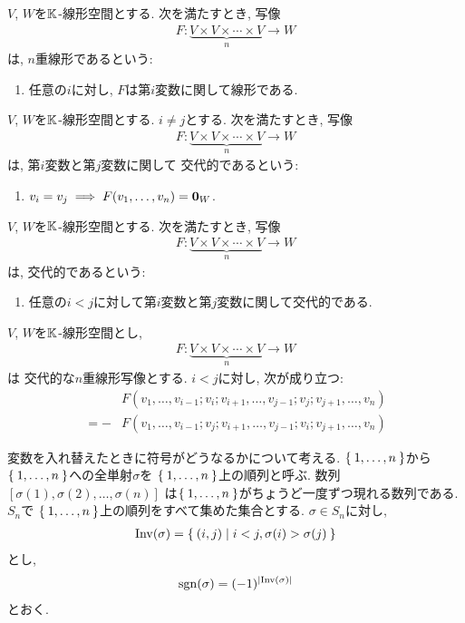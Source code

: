 \begin{definition}
  $V$, $W$を$\mathbb{K}$-線形空間とする.
  次を満たすとき,
  写像
  \begin{align*}
    F\colon \underbrace{V\times V\times \cdots \times V}_n\to W
  \end{align*}
  は,
  $n$重線形であるという:
  \begin{enumerate}
  \item 任意の$i$に対し, $F$は第$i$変数に関して線形である.
  \end{enumerate}
\end{definition}

\begin{definition}
  $V$, $W$を$\mathbb{K}$-線形空間とする.
  $i\neq j$とする.
  次を満たすとき,
  写像
  \begin{align*}
    F\colon \underbrace{V\times V\times \cdots \times V}_n\to W
  \end{align*}
  は,
  第$i$変数と第$j$変数に関して
  交代的であるという:
  \begin{enumerate}
      \item $v_i=v_j\implies F(v_1,\ldots,v_n)=\boldsymbol{0}_W$.
  \end{enumerate}
\end{definition}

\begin{definition}
  $V$, $W$を$\mathbb{K}$-線形空間とする.
  次を満たすとき,
  写像
  \begin{align*}
    F\colon \underbrace{V\times V\times \cdots \times V}_n\to W
  \end{align*}
  は,
  交代的であるという:
  \begin{enumerate}
  \item
    任意の$i<j$に対して第$i$変数と第$j$変数に関して交代的である.
  \end{enumerate}
\end{definition}
\begin{prop}
  $V$, $W$を$\mathbb{K}$-線形空間とし,
  \begin{align*}
    F\colon \underbrace{V\times V\times \cdots \times V}_n\to W
  \end{align*}
  は
  交代的な$n$重線形写像とする.
  $i<j$に対し, 次が成り立つ:
  \begin{align*}
    &F(v_1,\ldots,v_{i-1};v_i;v_{i+1},\ldots,v_{j-1};v_j;v_{j+1},\ldots,v_n)\\
    =
    -&
F(v_1,\ldots,v_{i-1};v_j;v_{i+1},\ldots,v_{j-1};v_i;v_{j+1},\ldots,v_n)
  \end{align*}
\end{prop}
変数を入れ替えたときに符号がどうなるかについて考える.
$\Set{1,\ldots,n}$から$\Set{1,\ldots,n}$への全単射$\sigma$を
$\Set{1,\ldots,n}$上の順列と呼ぶ.
数列$[\sigma(1),\sigma(2),\ldots,\sigma(n)]$
は$\Set{1,\ldots,n}$がちょうど一度ずつ現れる数列である.
$S_n$で
$\Set{1,\ldots,n}$上の順列をすべて集めた集合とする.
$\sigma\in S_n$に対し,
\begin{align*}
  \operatorname{Inv}(\sigma)=\Set{(i,j)|i<j,\sigma(i)>\sigma(j)}
\end{align*}
とし,
\begin{align*}
 \operatorname{sgn}(\sigma) =(-1)^{\left|\operatorname{Inv}(\sigma)\right|}
\end{align*}
とおく.

